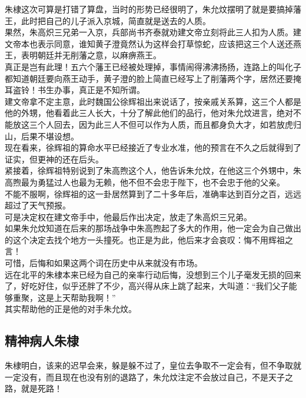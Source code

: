 \begin{multicols}{\theparacolNo}
朱棣这次可算是打错了算盘，当时的形势已经很明了，朱允炆摆明了就是要搞掉藩王，此时把自己的儿子派入京城，简直就是送去的人质。\\

果然，朱高炽三兄弟一入京，兵部尚书齐泰就劝建文帝立刻将此三人扣为人质。建文帝本也表示同意，谁知黄子澄竟然认为这样会打草惊蛇，应该把这三个人送还燕王，表明朝廷并无削藩之意，以麻痹燕王。\\

真正是岂有此理！五六个藩王已经被处理掉，事情闹得沸沸扬扬，连路上的叫化子都知道朝廷要向燕王动手，黄子澄的脸上简直已经写上了削藩两个字，居然还要掩耳盗铃！书生办事，真正是不知所谓。\\

建文帝拿不定主意，此时魏国公徐辉祖出来说话了，按亲戚关系算，这三个人都是他的外甥，他看着此三人长大，十分了解此他们的品行，他对朱允炆进言，绝对不能放这三个人回去，因为此三人不但可以作为人质，而且都身负大才，如若放虎归山，后果不堪设想。\\

现在看来，徐辉祖的算命水平已经接近了专业水准，他的预言在不久之后就得到了证实，但更神的还在后头。\\

紧接着，徐辉祖特别说到了朱高煦这个人，他告诉朱允炆，在他这三个外甥中，朱高煦最为勇猛过人也最为无赖，他不但不会忠于陛下，也不会忠于他的父亲。\\

不能不服啊，徐辉祖的这一卦居然算到了二十多年后，准确率达到百分之百，远远超过了天气预报。\\

可是决定权在建文帝手中，他最后作出决定，放走了朱高炽三兄弟。\\

如果朱允炆知道在后来的那场战争中朱高煦起了多大的作用，他一定会为自己做出的这个决定去找个地方一头撞死。也正是为此，他后来才会哀叹：悔不用辉祖之言！\\

可惜，后悔和如果这两个词在历史中从来就没有市场。\\

远在北平的朱棣本来已经为自己的亲率行动后悔，没想到三个儿子毫发无损的回来了，好吃好住，似乎还胖了不少，高兴得从床上跳了起来，大叫道：“我们父子能够重聚，这是上天帮助我啊！”\\

其实帮助他的正是他的对手朱允炆。\\

\subsection{精神病人朱棣}
朱棣明白，该来的迟早会来，躲是躲不过了，皇位去争取不一定会有，但不争取就一定没有，而且现在也没有别的退路了，朱允炆注定不会放过自己，不是天子之路，就是死路！\\


\end{multicols}
